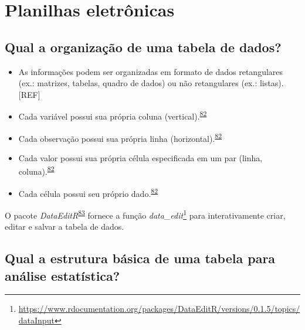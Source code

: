 \documentclass[
  a4paper,
]{book}
\renewcommand{\href}[2]{#2\footnote{\url{#1}}}
\newenvironment{infobox}[1]
  {
  \begin{itemize}
  \renewcommand{\labelitemi}{
    \raisebox{-.7\height}[0pt][0pt]{
      {\setkeys{Gin}{width=3em,keepaspectratio}
        \texttt{[image: \#1]}}
    }
  }
  \setlength{\fboxsep}{1em}
  \begin{blackbox}
  \item
  }
  {
  \end{blackbox}
  \end{itemize}
  }
\begin{document}
\hypertarget{planilhas}{%
\section{Planilhas eletrônicas}\label{planilhas}}

\hypertarget{qual-a-organizauxe7uxe3o-de-uma-tabela-de-dados}{%
\subsection{Qual a organização de uma tabela de dados?}\label{qual-a-organizauxe7uxe3o-de-uma-tabela-de-dados}}

\begin{itemize}
\item
  As informações podem ser organizadas em formato de dados retangulares (ex.: matrizes, tabelas, quadro de dados) ou não retangulares (ex.: listas).{[}REF{]}
\item
  Cada variável possui sua própria coluna (vertical).\textsuperscript{\protect\hyperlink{ref-tierney2023}{82}}
\item
  Cada observação possui sua própria linha (horizontal).\textsuperscript{\protect\hyperlink{ref-tierney2023}{82}}
\item
  Cada valor possui sua própria célula especificada em um par (linha, coluna).\textsuperscript{\protect\hyperlink{ref-tierney2023}{82}}
\item
  Cada célula possui seu próprio dado.\textsuperscript{\protect\hyperlink{ref-tierney2023}{82}}
\end{itemize}

\begin{infobox}{images/Rlogo}
O pacote \emph{DataEditR}\textsuperscript{\protect\hyperlink{ref-DataEditR}{83}} fornece a função \href{https://www.rdocumentation.org/packages/DataEditR/versions/0.1.5/topics/dataInput}{\emph{data\_edit}} para interativamente criar, editar e salvar a tabela de dados.

\end{infobox}

\hypertarget{qual-a-estrutura-buxe1sica-de-uma-tabela-para-anuxe1lise-estatuxedstica}{%
\subsection{Qual a estrutura básica de uma tabela para análise estatística?}\label{qual-a-estrutura-buxe1sica-de-uma-tabela-para-anuxe1lise-estatuxedstica}}
\end{document}
